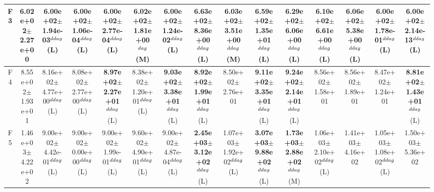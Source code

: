 \begin{table}[!t]
\begin{tabular}{c|cccccccccccccc}
F3  & 6.02e+02$\pm$2.27e+00  & 6.00e+02$\pm$1.94e-03$^{\\ddag}$ (L)  & 6.00e+02$\pm$1.06e-04$^{\\ddag}$ (L)  & 6.00e+02$\pm$2.77e-04$^{\\ddag}$ (L)  & \textbf{6.02e+02$\pm$1.81e+00}$^{\\dag}$ (M)  & 6.00e+02$\pm$1.24e-02$^{\\ddag}$ (L)  & \textbf{6.63e+02$\pm$8.36e+00}$^{\\ddag}$ (L)  & \textbf{6.03e+02$\pm$3.51e+00}$^{\\ddag}$ (M)  & \textbf{6.59e+02$\pm$1.35e+01}$^{\\ddag}$ (L)  & \textbf{6.29e+02$\pm$6.06e+00}$^{\\ddag}$ (L)  & \textbf{6.10e+02$\pm$6.61e+00}$^{\\ddag}$ (L)  & \textbf{6.06e+02$\pm$5.38e+00}$^{\\ddag}$ (L)  & 6.00e+02$\pm$1.78e-01$^{\\ddag}$ (L)  & 6.00e+02$\pm$2.14e-13$^{\\ddag}$ (L) \\ \hline
F4  & 8.55e+02$\pm$1.93e+01  & 8.16e+02$\pm$4.77e+00$^{\\ddag}$ (L)  & 8.08e+02$\pm$2.77e+00$^{\\ddag}$ (L)  & \textbf{8.97e+02$\pm$2.27e+01}$^{\\ddag}$ (L)  & 8.38e+02$\pm$1.20e+01$^{\\ddag}$ (L)  & \textbf{9.03e+02$\pm$3.38e+01}$^{\\ddag}$ (L)  & \textbf{8.92e+02$\pm$1.99e+01}$^{\\ddag}$ (L)  & 8.50e+02$\pm$2.76e+01   & \textbf{9.11e+02$\pm$3.35e+01}$^{\\ddag}$ (L)  & \textbf{9.24e+02$\pm$2.14e+01}$^{\\ddag}$ (L)  & 8.56e+02$\pm$1.58e+01   & 8.56e+02$\pm$1.89e+01   & 8.47e+02$\pm$1.24e+01   & \textbf{8.81e+02$\pm$1.43e+01}$^{\\ddag}$ (L) \\ \hline
F5  & 1.46e+03$\pm$4.22e+02  & 9.00e+02$\pm$4.42e-01$^{\\ddag}$ (L)  & 9.00e+02$\pm$0.00e+00$^{\\ddag}$ (L)  & 9.00e+02$\pm$1.99e-01$^{\\ddag}$ (L)  & 9.60e+02$\pm$4.90e+01$^{\\ddag}$ (L)  & 9.00e+02$\pm$4.87e-04$^{\\ddag}$ (L)  & \textbf{2.45e+03$\pm$3.12e+02}$^{\\ddag}$ (L)  & 1.07e+03$\pm$1.92e+02$^{\\ddag}$ (L)  & \textbf{3.07e+03$\pm$9.88e+02}$^{\\ddag}$ (L)  & \textbf{1.73e+03$\pm$2.88e+02}$^{\\ddag}$ (M)  & 1.06e+03$\pm$2.10e+02$^{\\ddag}$ (L)  & 1.41e+03$\pm$4.16e+02   & 1.05e+03$\pm$1.08e+02$^{\\ddag}$ (L)  & 1.50e+03$\pm$5.36e+02  \\ \hline

\end{tabular}
\end{table}
